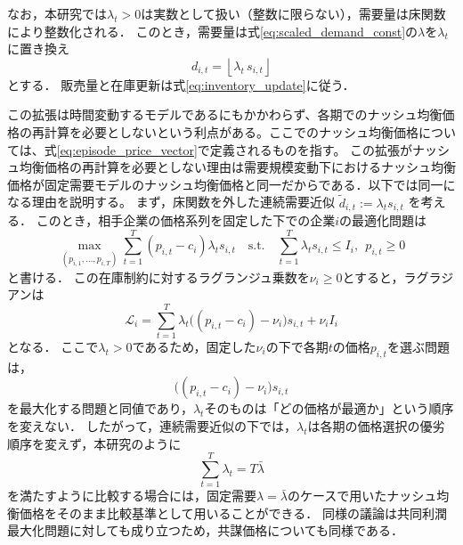 \documentclass[runningheads]{llncs}
\begin{document}
なお，本研究では$\lambda_t>0$は実数として扱い（整数に限らない），需要量は床関数により整数化される．
このとき，需要量は式\eqref{eq:scaled_demand_const}の$\lambda$を$\lambda_t$に置き換え
\begin{equation}
d_{i,t}=\left\lfloor \lambda_t\, s_{i,t} \right\rfloor
\label{eq:scaled_demand}
\end{equation}
とする．
販売量と在庫更新は式\eqref{eq:inventory_update}に従う．

この拡張は時間変動するモデルであるにもかかわらず、各期でのナッシュ均衡価格の再計算を必要としないという利点がある。ここでのナッシュ均衡価格については、式\eqref{eq:episode_price_vector}で定義されるものを指す。
この拡張がナッシュ均衡価格の再計算を必要としない理由は需要規模変動下におけるナッシュ均衡価格が固定需要モデルのナッシュ均衡価格と同一だからである．以下では同一になる理由を説明する。
まず，床関数を外した連続需要近似
$
\tilde d_{i,t}:=\lambda_t s_{i,t}
\label{eq:scaled_demand_relaxed}
$
を考える．
このとき，相手企業の価格系列を固定した下での企業$i$の最適化問題は %
\begin{equation}
\max_{(p_{i,1},\dots,p_{i,T})}
\sum_{t=1}^{T}(p_{i,t}-c_i)\lambda_t s_{i,t}
\quad
\text{s.t.}\quad
\sum_{t=1}^{T}\lambda_t s_{i,t}\le I_i,\ \ p_{i,t}\ge 0
\label{eq:timevarying_lambda_relaxed_problem}
\end{equation}
と書ける．
この在庫制約に対するラグランジュ乗数を$\nu_i\ge 0$とすると，ラグラジアンは
\begin{equation}
\mathcal{L}_i
=
\sum_{t=1}^{T}
\lambda_t\bigl((p_{i,t}-c_i)-\nu_i\bigr)s_{i,t}
+\nu_i I_i
\label{eq:timevarying_lambda_lagrangian}
\end{equation}
となる．
ここで$\lambda_t>0$であるため，固定した$\nu_i$の下で各期$t$の価格$p_{i,t}$を選ぶ問題は，
\begin{equation}
\bigl((p_{i,t}-c_i)-\nu_i\bigr)s_{i,t}
\label{eq:timevarying_lambda_inner_problem}
\end{equation}
を最大化する問題と同値であり，$\lambda_t$そのものは「どの価格が最適か」という順序を変えない．
したがって，連続需要近似の下では，$\lambda_t$は各期の価格選択の優劣順序を変えず，本研究のように
\begin{equation}
\sum_{t=1}^{T}\lambda_t = T\bar{\lambda}
\label{eq:timevarying_lambda_sum}
\end{equation}
を満たすように比較する場合には，固定需要$\lambda=\bar{\lambda}$のケースで用いたナッシュ均衡価格をそのまま比較基準として用いることができる．
同様の議論は共同利潤最大化問題に対しても成り立つため，共謀価格についても同様である．
\end{document}
